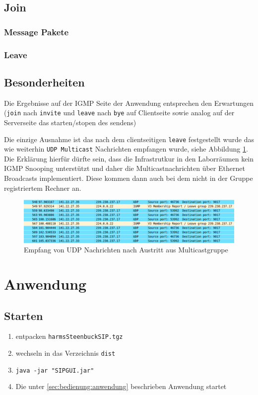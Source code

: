 \documentclass[10pt]{scrartcl}
\begin{document}
	\subsection{Join}
	
	
	\subsubsection{Message Pakete}
	
	\subsubsection{Leave}
	
	
	\subsection{Besonderheiten}
	
	Die Ergebnisse auf der IGMP Seite der Anwendung entsprechen den Erwartungen (\verb!join! nach \verb!invite! und \verb!leave! nach \verb!bye! auf Clientseite sowie analog auf der Serverseite das starten/stopen des sendens)
	
	Die einzige Ausnahme ist das nach dem clientseitigen \verb!leave! festgestellt wurde das wie weiterhin \verb!UDP Multicast! Nachrichten empfangen wurde, siehe Abbildung \ref{img:cap1}. 
	Die Erklärung hierfür dürfte sein, dass die Infrastrutkur in den Laborräumen kein IGMP Snooping unterstützt und daher die Multicastnachrichten über Ethernet Broadcasts implementiert. Diese kommen dann auch bei dem nicht in der Gruppe registriertem Rechner an.
	
	
	\begin{figure}[htb]
        \centering
         \includegraphics[width=\textwidth]{img/udp_after_leaving}
         \caption{Empfang von UDP Nachrichten nach Austritt aus Multicastgruppe}
        \label{img:cap1}
	\end{figure}	



\section{Anwendung}

\subsection{Starten}
\begin{enumerate}
	\item entpacken \verb!harmsSteenbuckSIP.tgz!
	\item wechseln in das Verzeichnis \verb!dist!
	\item \verb!java -jar "SIPGUI.jar"!
	\item Die unter \ref{sec:bedienung:anwendung} beschrieben Anwendung startet
\end{enumerate}
\end{document}
